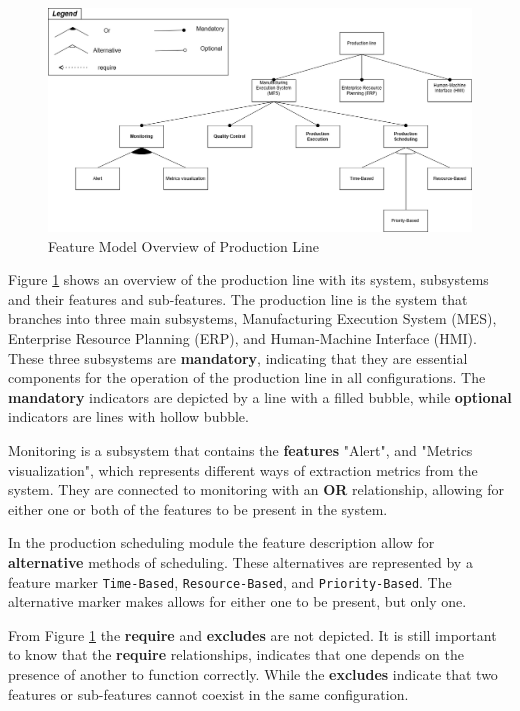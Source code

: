 \begin{figure}[H]
    \centering
    \caption{Feature Model Overview of Production Line}
    \label{fig:feature-model}
    \includegraphics[width=1\linewidth]{report/GroupTemplate/images/feature_modelling.png}
\end{figure}

Figure \ref{fig:feature-model} shows an overview of the production line with its system, subsystems and their features and sub-features. The production line is the system that branches into three main subsystems, Manufacturing Execution System (MES), Enterprise Resource Planning (ERP), and Human-Machine Interface (HMI). These three subsystems are \textbf{mandatory}, indicating that they are essential components for the operation of the production line in all configurations. The \textbf{mandatory} indicators are depicted by a line with a filled bubble, while \textbf{optional} indicators are lines with hollow bubble.

Monitoring is a subsystem that contains the \textbf{features} "Alert", and "Metrics visualization", which represents different ways of extraction metrics from the system. They are connected to monitoring with an \textbf{OR} relationship, allowing for either one or both of the features to be present in the system.

In the production scheduling module the feature description allow for \textbf{alternative} methods of scheduling. These alternatives are represented by a feature marker \texttt{Time-Based}, \texttt{Resource-Based}, and \texttt{Priority-Based}. The alternative marker makes allows for either one to be present, but only one.

From Figure \ref{fig:feature-model} the \textbf{require} and \textbf{excludes} are not depicted. It is still important to know that the \textbf{require} relationships, indicates that one depends on the presence of another to function correctly. While the \textbf{excludes} indicate that two features or sub-features cannot coexist in the same configuration.

